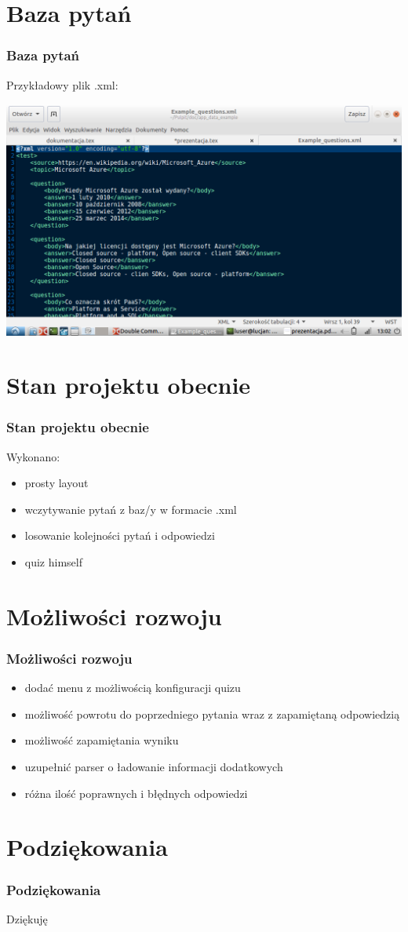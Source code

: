 \documentclass[11pt]{beamer}
\begin{document}
\section{Baza pytań}
\begin{frame}
\frametitle{Baza pytań}
Przykładowy plik .xml:
\begin{center}
\includegraphics[scale=0.3]{../imgs/Xml_screenshot.png}
\end{center}
\end{frame}
\section{Stan projektu obecnie}
\begin{frame}
\frametitle{Stan projektu obecnie}\pause
Wykonano:\pause
\begin{itemize}
\item prosty layout\pause
\item wczytywanie pytań z baz/y w formacie .xml\pause
\item losowanie kolejności pytań i odpowiedzi\pause
\item quiz himself
\end{itemize}
\end{frame}
\section{Możliwości rozwoju}
\begin{frame}
\frametitle{Możliwości rozwoju}\pause
\begin{itemize}
\item dodać menu z możliwością konfiguracji quizu\pause
\item możliwość powrotu do poprzedniego pytania wraz z zapamiętaną odpowiedzią\pause
\item możliwość zapamiętania wyniku\pause
\item uzupełnić parser o ładowanie informacji dodatkowych\pause
\item różna ilość poprawnych i błędnych odpowiedzi
\end{itemize}
\end{frame}
\section{Podziękowania}
\begin{frame}
\frametitle{Podziękowania}\pause
\Huge{Dz\pause i\pause ęku\pause ję}
\end{frame}
\end{document}
